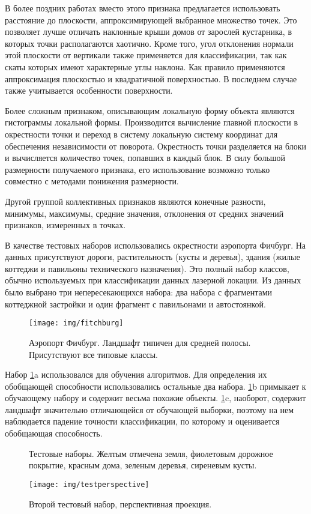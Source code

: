 В более поздних работах\cite{full waveform} вместо этого признака предлагается использовать расстояние до плоскости, аппроксимирующей выбранное множество точек. Это позволяет лучше отличать наклонные крыши домов от зарослей кустарника, в которых точки располагаются хаотично. Кроме того, угол отклонения нормали этой плоскости от вертикали также применяется для классификации, так как скаты которых имеют характерные углы наклона.  
Как правило применяются аппроксимация плоскостью и квадратичной поверхностью. В последнем случае также учитывается особенности поверхности. \cite{Brenner}

Более сложным признаком, описывающим локальную форму объекта являются гистограммы локальной формы\cite{MMM}.
Производится вычисление главной плоскости в окрестности точки и переход в систему локальную систему координат для обеспечения независимости от поворота. Окрестность точки разделяется на блоки и вычисляется количество точек, попавших в каждый блок. В силу большой размерности получаемого признака, его использование возможно только совместно с методами понижения размерности.

Другой группой коллективных признаков являются конечные разности, минимумы, максимумы, средние значения, отклонения от средних значений признаков, измеренных в точках.

\label{test data}

В качестве тестовых наборов использовались окрестности аэропорта Фичбург. На данных присутствуют дороги, растительность (кусты и деревья), здания (жилые коттеджи и павильоны технического назначения). Это полный набор классов, обычно используемых при классификации данных лазерной локации. Из данных было выбрано три непересекающихся набора: два набора с фрагментами коттеджной застройки и один фрагмент с павильонами и автостоянкой.
\begin{figure}[h]
\centering
\texttt{[image: img/fitchburg]}
\caption{Аэропорт Фичбург. Ландшафт типичен для средней полосы. Присутствуют все типовые классы.}
\end{figure}
Набор \ref{sets}a использовался для обучения алгоритмов. Для определения их обобщающей способности использовались остальные два набора. \ref{sets}b примыкает к обучающему набору и содержит весьма похожие объекты. \ref{sets}c, наоборот, содержит ландшафт значительно отличающейся от обучающей выборки, поэтому на нем наблюдается падение точности классификации, по которому и оценивается обобщающая способность.
\begin{figure}[h]
\centering
{}\qquad
{}\qquad
{}
\caption{Тестовые наборы. Желтым отмечена земля, фиолетовым дорожное покрытие, красным дома, зеленым деревья, сиреневым кусты.}
\label{sets}
\end{figure}
\begin{figure}[h]
\centering
\texttt{[image: img/testperspective]}
\caption{Второй тестовый набор, перспективная проекция.}
\end{figure}